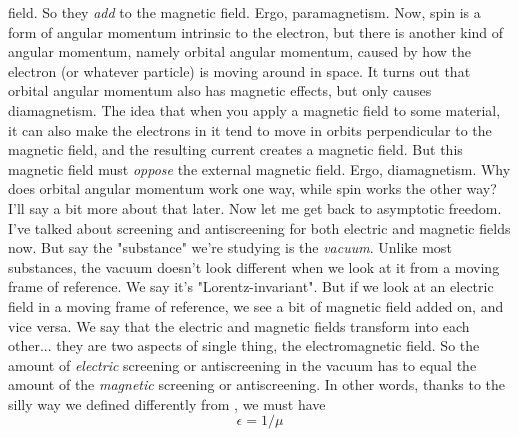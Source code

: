 field.  So they \emph{add} to the magnetic field.  Ergo, paramagnetism.
Now, spin is a form of angular momentum intrinsic to the electron,
but there is another kind of angular momentum, namely orbital angular
momentum, caused by how the electron (or whatever particle) is moving 
around in space.  It turns out that orbital angular momentum also
has magnetic effects, but only causes diamagnetism.  The idea 
that when you apply a magnetic field to some material, it can also make
the electrons in it tend to move in orbits perpendicular to the
magnetic field, and the resulting current creates a magnetic field.
But this magnetic field must \emph{oppose} the external magnetic field.
Ergo, diamagnetism.  
Why does orbital angular momentum work one way, while spin works
the other way?  I'll say a bit more about that later. Now let
me get back to asymptotic freedom.
I've talked about screening and antiscreening for both electric
and magnetic fields now.  But say the "substance" we're studying
is the \emph{vacuum}.  Unlike most substances, the vacuum doesn't look
different when we look at it from a moving frame of reference.  We
say it's "Lorentz-invariant".  But if we look at an electric field 
in a moving frame of reference, we see a bit of magnetic field
added on, and vice versa.   We say that the electric and magnetic
fields transform into each other... they are two aspects of single
thing, the electromagnetic field.  So the amount of \emph{electric} screening
or antiscreening in the vacuum has to equal the amount of the 
\emph{magnetic} screening or antiscreening.  In other words, thanks to
the silly way we defined \epsilon  differently from \mu , we must have
$$
                       \epsilon  = 1/\mu 
$$
    
